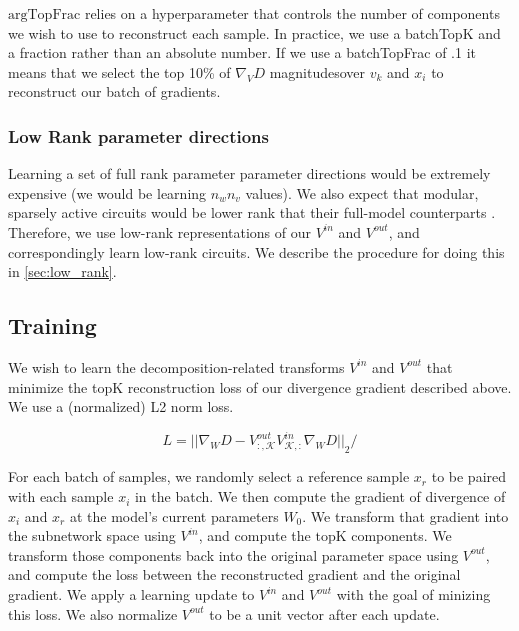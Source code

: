 \documentclass{article}
\theoremstyle{plain}
\theoremstyle{definition}
\theoremstyle{remark}
\begin{document}
$\text{argTopFrac}$ relies on a hyperparameter that controls the number of components we wish to use to reconstruct each sample. In practice, we use a batchTopK \cite{bussmann2024batchtopk} and a fraction rather than an absolute number. If we use a batchTopFrac of .1 it means that we select the top 10\% of $\nabla_V D$ magnitudesover $v_k$ and $x_i$ to reconstruct our batch of gradients.

\subsubsection{Low Rank parameter directions}
Learning a set of full rank parameter parameter directions would be extremely expensive (we would be learning $n_w n_v$ values). We also expect that modular, sparsely active circuits would be lower rank that their full-model counterparts \cite{}. Therefore, we use low-rank representations of our $V^{in}$ and $V^{out}$, and correspondingly learn low-rank circuits. We describe the procedure for doing this in \ref{sec:low_rank}. 


\subsection{Training}\label{sec:training}
We wish to learn the decomposition-related transforms $V^{in}$ and $V^{out}$ that minimize the topK reconstruction loss of our divergence gradient described above. We use a (normalized) L2 norm loss.

\begin{equation}
    L = {|| \nabla_W D - V^{out}_{:,\mathcal{K}} V^{in}_{\mathcal{K},:} \nabla_W D ||}_2 /  
\end{equation}

For each batch of samples, we randomly select a reference sample $x_r$ to be paired with each sample $x_i$ in the batch. We then compute the gradient of divergence of $x_i$ and $x_r$ at the model's current parameters $W_0$. We transform that gradient into the subnetwork space using $V^{in}$, and compute the $\text{topK}$ components. We transform those components back into the original parameter space using $V^{out}$, and compute the loss between the reconstructed gradient and the original gradient. We apply a learning update to $V^{in}$ and $V^{out}$ with the goal of minizing this loss. We also normalize $V^{out}$ to be a unit vector after each update. 
\end{document}
